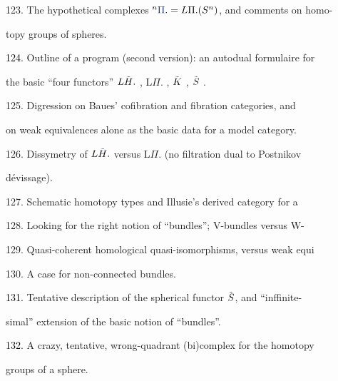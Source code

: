\documentclass[10pt,oneside]{book}
\newcommand{\hand}[1]{{\ifnum\EditionMode=2\color{black}\else\color{PSHand}\fi #1}}
\begin{document}
123. The hypothetical complexes $^{n}\hand{\Pi}. = L\Pi.(S^{n})$, and comments on homo-\par%
topy groups of spheres.\par

\hand{\textcircled{\textcolor{black}{124.}}} Outline of a program (second version): an autodual formulaire for\par
the basic ``four functors'' $L\hand{\tilde{\textcolor{black}{H}}}.$ , L$\Pi$. , $\hand{\tilde{\textcolor{black}{K}}}$ , $\hand{\tilde{\textcolor{black}{S}}}$ .\par

125. Digression on Baues' cofibration and fibration categories, and\par
on weak equivalences alone as the basic data for a model category.\par

126. Dissymetry of $L\hand{\tilde{\textcolor{black}{H}}}.$ versus L$\Pi$. (no filtration dual to Postnikov\par
dévissage).\par

127. Schematic homotopy types and Illusie's derived category for a \par

128. Looking for the right notion of ``bundles\hand{''}; V-bundles versus W-\par

129. Quasi-coherent homological quasi-isomorphisms, versus weak equi\par

130. A case for non-connected bundles.\par

\hand{\textcircled{\textcolor{black}{131.}}} Tentative description of the spherical functor $\hand{\tilde{\textcolor{black}{S}}}$, and ``inffinite-\par%
simal'' extension of the basic notion of ``bundles''.\par

\hand{\textcircled{\textcolor{black}{132.}}} A crazy\hand{,} tentative\hand{,} wrong-quadrant (bi)complex for the homotopy\par
groups of a sphere.\par
{}\par
\end{document}
